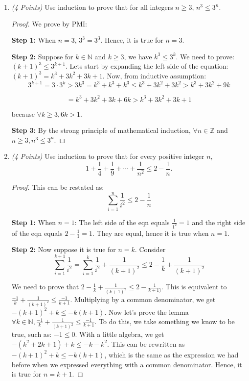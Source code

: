 \documentclass[10pt]{article} %
\newcommand{\N}{\mathbb{N}}
\newcommand{\Z}{\mathbb{Z}}
\newcommand{\points}[1]{{\it (#1 Points)}}
\begin{document}
\begin{enumerate}
\item \points{4} Use induction to prove that for all integers $n \geq 3$, $n^3 \leq 3^n$.

\bigskip

\begin{proof}

 We prove by PMI:

{\bf Step 1:} When $n=3$, $3^3=3^3$.  Hence, it is true for $n=3$.  

{\bf Step 2:} Suppose for $k \in \N$ and $k \geq 3$, we have $k^3 \leq 3^k$.  We need to prove: $(k+1)^3 \leq 3^{k+1}$.  Lets start by expanding the left side of the equation: $(k+1)^3=k^3+3k^2+3k+1$.  Now, from inductive assumption: $$3^{k+1} = 3 \cdot 3^k > 3k^3 = k^3+k^3+k^3 \leq k^3+3k^2+3k^2>k^3+3k^2+9k$$

$$ = k^3+3k^2+3k+6k > k^3+3k^2+3k+1$$

because $\forall k \geq 3, 6k > 1$.  

{\bf Step 3:} By the strong principle of mathematical induction, $\forall n \in \Z$ and $n \geq 3, n^3 \leq 3^n$.

\end{proof}

\bigskip

\item \points{4} Use induction to prove that for every positive integer $n$,
    $$1+\frac{1}{4}+\frac{1}{9}+\cdots+\frac{1}{n^2}\le 2-\frac{1}{n}.$$
    
\bigskip

\begin{proof}

 This can be restated as: $$\sum_{i=1}^n \frac{1}{i^2} \leq 2 - \frac{1}{n}$$

{\bf Step 1:} When $n=1$: The left side of the eqn equals $\frac{1}{1^2} = 1$ and the right side of the eqn equals $2 - \frac{1}{1} = 1$.  They are equal, hence it is true when $n=1$.  

{\bf Step 2:} Now suppose it is true for $n=k$.  Consider $$\sum_{i=1}^{k+1} \frac{1}{i^2} = \sum_{i=1}^k \frac{1}{i^2} + \frac{1}{(k+1)^2} \leq 2 - \frac{1}{k} + \frac{1}{(k+1)^2}$$

We need to prove that $2 - \frac{1}{k} + \frac{1}{(k+1)^2} \leq 2 - \frac{1}{k+1)}$.  This is equivalent to $\frac{-1}{k} + \frac{1}{(k+1)^2} \leq \frac{-1}{k+1}$.  Multiplying by a common denominator, we get $-(k+1)^2+k \leq -k(k+1)$.  Now let's prove the lemma $\forall k \in \N, \frac{-1}{k} + \frac{1}{(k+1)^2} \leq \frac{-1}{k+1}$.  To do this, we take something we know to be true, such as: $-1 \leq 0$.  With a little algebra, we get $-(k^2+2k+1)+k \leq -k-k^2$.  This can be rewritten as $-(k+1)^2+k \leq -k(k+1)$, which is the same as the expression we had before when we expressed everything with a common denominator.  Hence, it is true for $n=k+1$.  


\end{proof}
\end{enumerate}
\end{document}
